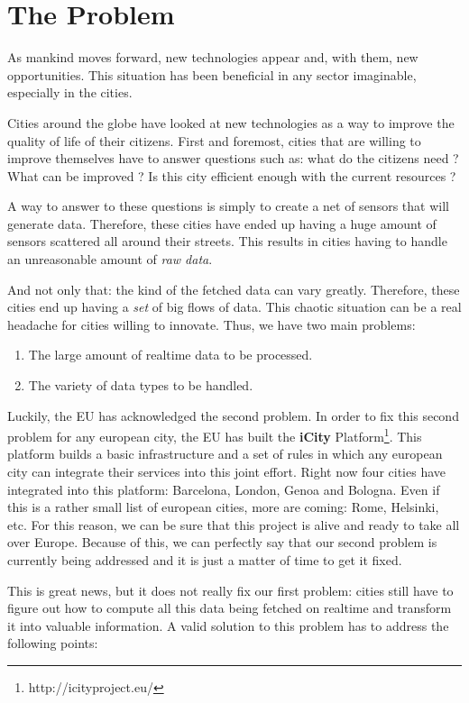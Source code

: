 
\section{The Problem}
\label{sec:problem}

As mankind moves forward, new technologies appear and, with them, new
opportunities. This situation has been beneficial in any sector imaginable,
especially in the cities.

Cities around the globe have looked at new technologies as a way to improve the
quality of life of their citizens. First and foremost, cities that are willing
to improve themselves have to answer questions such as: what do the citizens
need ? What can be improved ? Is this city efficient enough with the current
resources ?

A way to answer to these questions is simply to create a net of sensors that
will generate data. Therefore, these cities have ended up having a huge amount
of sensors scattered all around their streets. This results in cities having to
handle an unreasonable amount of {\it raw data}.

And not only that: the kind of the fetched data can vary greatly. Therefore,
these cities end up having a {\it set} of big flows of data. This chaotic
situation can be a real headache for cities willing to innovate. Thus, we have
two main problems:

\begin{enumerate}
  \itemsep0em
  \item The large amount of realtime data to be processed.
  \item The variety of data types to be handled.
\end{enumerate}

Luckily, the \ac{EU} has acknowledged the second
problem. In order to fix this second problem for any european city, the EU has
built the {\bf iCity} Platform\footnote{http://icityproject.eu/}. This platform
builds a basic infrastructure and a set of rules in which any european city can
integrate their services into this joint effort. Right now four cities have
integrated into this platform: Barcelona, London, Genoa and Bologna. Even if
this is a rather small list of european cities, more are coming:
Rome, Helsinki, etc. For this reason, we can be sure that this project is alive
and ready to take all over Europe. Because of this, we can perfectly say that
our second problem is currently being addressed and it is just a matter of time
to get it fixed.

This is great news, but it does not really fix our first problem: cities still
have to figure out how to compute all this data being fetched on realtime and
transform it into valuable information. A valid solution to this problem has to
address the following points:

